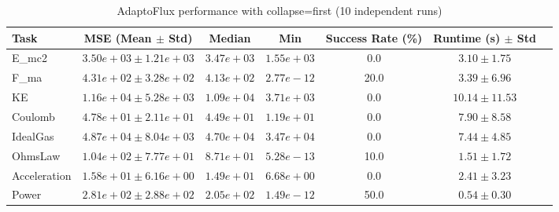 \begin{table}[h]
\centering
\caption{AdaptoFlux performance with collapse=first (10 independent runs)}
\label{tab:atf_full_stats_first}
\begin{tabular}{lcccccc}
\toprule
Task & MSE (Mean $\pm$ Std) & Median & Min & Success Rate (\%) & Runtime (s) $\pm$ Std \\
\midrule
E_mc2 & $3.50e+03 \pm 1.21e+03$ & $3.47e+03$ & $1.55e+03$ & 0.0 & $3.10 \pm 1.75$ \\
F_ma & $4.31e+02 \pm 3.28e+02$ & $4.13e+02$ & $2.77e-12$ & 20.0 & $3.39 \pm 6.96$ \\
KE & $1.16e+04 \pm 5.28e+03$ & $1.09e+04$ & $3.71e+03$ & 0.0 & $10.14 \pm 11.53$ \\
Coulomb & $4.78e+01 \pm 2.11e+01$ & $4.49e+01$ & $1.19e+01$ & 0.0 & $7.90 \pm 8.58$ \\
IdealGas & $4.87e+04 \pm 8.04e+03$ & $4.70e+04$ & $3.47e+04$ & 0.0 & $7.44 \pm 4.85$ \\
OhmsLaw & $1.04e+02 \pm 7.77e+01$ & $8.71e+01$ & $5.28e-13$ & 10.0 & $1.51 \pm 1.72$ \\
Acceleration & $1.58e+01 \pm 6.16e+00$ & $1.49e+01$ & $6.68e+00$ & 0.0 & $2.41 \pm 3.23$ \\
Power & $2.81e+02 \pm 2.88e+02$ & $2.05e+02$ & $1.49e-12$ & 50.0 & $0.54 \pm 0.30$ \\
\bottomrule
\end{tabular}
\end{table}